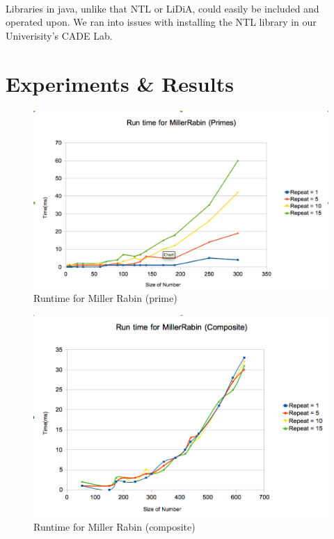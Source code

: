\documentclass[paper=a4, fontsize=11pt]{scrartcl}	%
\numberwithin{equation}{section}		%
\numberwithin{figure}{section}		%
\numberwithin{table}{section}		%
\begin{document}
\paragraph{} Libraries in java, unlike that NTL or LiDiA, could easily be included and operated upon. We ran into issues with installing the NTL library in our Univerisity's CADE Lab. 
\section{Experiments \& Results}
\begin{figure}[t]
\begin{centering}
\includegraphics[scale=0.4]{./MR_P.eps}
\par\end{centering}

\caption{Runtime for Miller Rabin (prime)\label{fig:MR_P}}

\end{figure}
\begin{figure}[t]
\begin{centering}
\includegraphics[scale=0.4]{./MR_C.png}
\par\end{centering}

\caption{Runtime for Miller Rabin (composite)\label{fig:MR_C}}

\end{figure}
\end{document}
